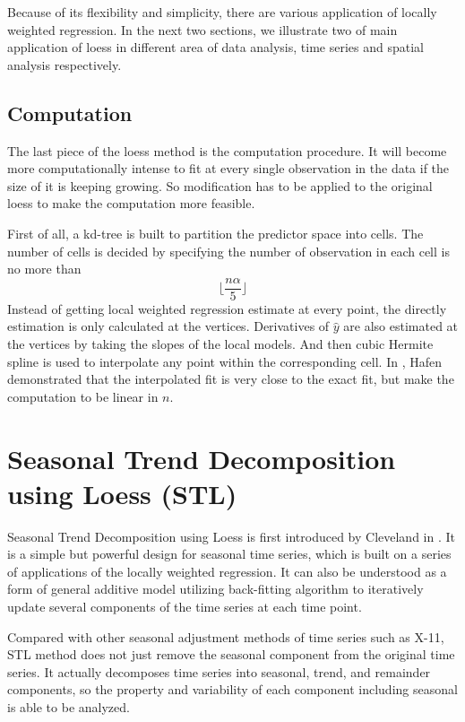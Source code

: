 Because of its flexibility and simplicity, there are various
application of locally weighted regression. In the next two sections, we illustrate
two of main application of loess in different area of data analysis, time series
and spatial analysis respectively.

\subsection{Computation}

The last piece of the loess method is the computation procedure. It will become
more computationally intense to fit at every single observation in the data if 
the size of it is keeping growing. So modification has to be applied to the 
original loess to make the computation more feasible. 

First of all, a kd-tree \cite{friedman1977algorithm} is built to partition the 
predictor space into cells. The number of cells is decided by specifying the 
number of observation in each cell is no more than 
\begin{equation} 
\lfloor\frac{n\alpha}{5}\rfloor
\end{equation} 
Instead of getting local weighted regression estimate at every point,
the directly estimation is only calculated at the vertices. Derivatives of 
$\hat y$ are also estimated at the vertices by taking the slopes of the local 
models. And then cubic Hermite spline is used to interpolate any point within the
corresponding cell.
In \cite{hafen2010local}, Hafen demonstrated that the interpolated fit is very 
close to the exact fit, but make the computation to be linear in $n$.



\section{Seasonal Trend Decomposition using Loess (STL)}
\label{sec:stl}

Seasonal Trend Decomposition using Loess is first introduced by Cleveland in 
\cite{Cleveland:1990}. It is a simple but powerful design for seasonal time
series, which is built on a series of applications of the locally weighted 
regression. It can also be understood as a form of general additive model utilizing
back-fitting algorithm to iteratively update several components of the time series
at each time point.  

Compared with other seasonal adjustment methods of time series such as X-11,
STL method does not just remove the seasonal component from the original 
time series. It actually decomposes time series into seasonal, trend, and remainder
components, so the property and variability of each component including seasonal 
is able to be analyzed. 

